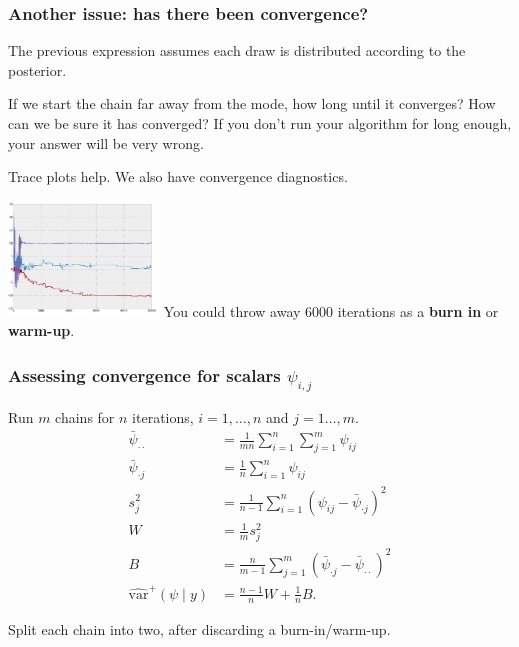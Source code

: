 \documentclass{beamer}
\begin{document}
\begin{frame}
\frametitle{Another issue: has there been convergence?}

The previous expression assumes each draw is distributed according to the posterior. 
\newline

If we start the chain far away from the mode, how long until it converges? How can we be sure it has converged? If you don't run your algorithm for long enough, your answer will be very wrong.
\newline
\pause

Trace plots help. We also have convergence diagnostics.
\newline

\includegraphics[width=40mm]{convergence.png} You could throw away $6000$ iterations as a {\bf burn in} or {\bf warm-up}.

\end{frame}

\begin{frame}
\frametitle{Assessing convergence for scalars $\psi_{i,j}$}

Run $m$ chains for $n$ iterations, $i=1,\ldots,n$ and $j=1\ldots,m$.
\begin{align*}
\bar{\psi}_{\cdot \cdot} &= \frac{1}{mn}\sum_{i=1}^n\sum_{j=1}^m \psi_{ij} \tag{overall average} \\
\bar{\psi}_{\cdot j} &= \frac{1}{n}\sum_{i=1}^n \psi_{ij} \tag{chain average} \\
s^2_j &= \frac{1}{n-1}\sum_{i=1}^n (\psi_{ij}-\bar{\psi}_{\cdot j})^2 \tag{chain sd} \\
W &= \frac{1}{m} s^2_j \tag{within-sequence variance} \\
B &= \frac{n}{m-1} \sum_{j=1}^m (\bar{\psi}_{\cdot j} - \bar{\psi}_{\cdot \cdot})^2\\
\hat{\text{var}}^{+}(\psi \mid y) &=\frac{n-1}{n}W + \frac{1}{n}B.
\end{align*}

Split each chain into two, after discarding a burn-in/warm-up.
\end{frame}
\end{document}
